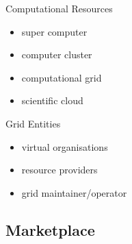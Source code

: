 {
\begin{frame}
\begin{block}{Computational Resources}
	\begin{itemize}
		\item super computer\pause
		\item computer cluster\pause
		\item computational grid\pause
		\item scientific cloud
	\end{itemize}
\end{block}
\end{frame}

\begin{frame}
\begin{block}{Grid Entities}
	\begin{itemize}
		\item virtual organisations
		\item resource providers
		\item grid maintainer/operator
	\end{itemize}
\end{block}
\end{frame}
}

\subsection{Marketplace}

